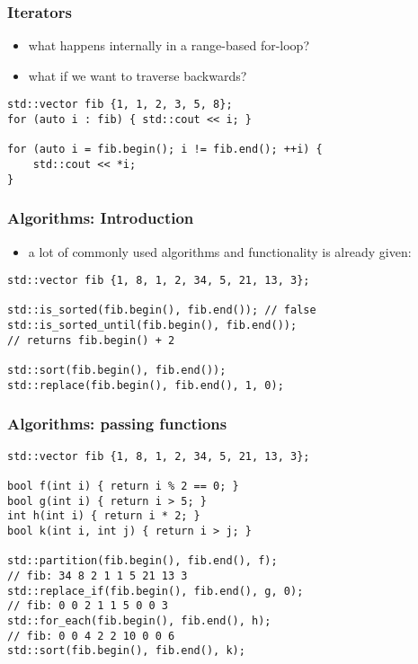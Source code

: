 \begin{frame}[fragile]
    \frametitle{Iterators}
    \begin{itemize}
        \item what happens internally in a range-based for-loop?
        \item what if we want to traverse backwards?
    \end{itemize}
    \begin{lstlisting}[numbers=none]
std::vector fib {1, 1, 2, 3, 5, 8};
for (auto i : fib) { std::cout << i; }

for (auto i = fib.begin(); i != fib.end(); ++i) {
    std::cout << *i;
}
    \end{lstlisting}
\end{frame}

\begin{frame}[fragile]
    \frametitle{Algorithms: Introduction}
    \begin{itemize}
        \item a lot of commonly used algorithms and functionality is already given:
    \end{itemize}
    \begin{lstlisting}[numbers=none]
std::vector fib {1, 8, 1, 2, 34, 5, 21, 13, 3};

std::is_sorted(fib.begin(), fib.end()); // false
std::is_sorted_until(fib.begin(), fib.end());
// returns fib.begin() + 2

std::sort(fib.begin(), fib.end());
std::replace(fib.begin(), fib.end(), 1, 0);
    \end{lstlisting}
\end{frame}

\begin{frame}[fragile]
    \frametitle{Algorithms: passing functions}
    \begin{lstlisting}[numbers=none]
std::vector fib {1, 8, 1, 2, 34, 5, 21, 13, 3};

bool f(int i) { return i % 2 == 0; }
bool g(int i) { return i > 5; }
int h(int i) { return i * 2; }
bool k(int i, int j) { return i > j; }

std::partition(fib.begin(), fib.end(), f);
// fib: 34 8 2 1 1 5 21 13 3
std::replace_if(fib.begin(), fib.end(), g, 0);
// fib: 0 0 2 1 1 5 0 0 3
std::for_each(fib.begin(), fib.end(), h);
// fib: 0 0 4 2 2 10 0 0 6
std::sort(fib.begin(), fib.end(), k);
    \end{lstlisting}
\end{frame}

